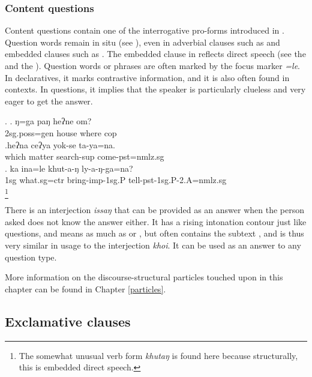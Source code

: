 \subsubsection{Content questions}

Content questions contain one of the interrogative pro-forms introduced in . Question words remain in situ (see \Next[a]), even in adverbial clauses such as \Next[b] and embedded clauses such as \Next[c]. The embedded clause in \Next[c] reflects direct speech (see the  and the ). Question words or phrases are often marked by the focus marker \emph{=le}. In declaratives, it marks contrastive information,  and it is also often found in  contexts. In questions, it implies that the speaker is particularly clueless and very eager to get the answer.
\newpage 

\ex. \ag. ŋ=ga          paŋ  heʔne om?\\
{\sc 2sg.poss=gen} house where {\sc cop}\\
 
\bg.heʔna ceʔya yok-se ta-ya=na.\\
which  matter search{\sc -sup} come{\sc [3sg]-pst=nmlz.sg}\\
\bg. ka ina=le khut-a-ŋ ly-a-ŋ-ga=na?\\
{\sc 1sg} what{\sc .sg=ctr} bring{\sc -imp-1sg.P} tell{\sc -pst-1sg.P-2.A=nmlz.sg}\\
\footnote{The somewhat unusual verb form \emph{khutaŋ}  is found here because structurally, this is embedded direct speech.}


There is an interjection \emph{issaŋ} that can be provided as an answer when the person asked does not know the answer either. It has a rising intonation contour just like questions, and means as much as  or , but often contains the subtext , and is thus very similar in usage to the  interjection \emph{khoi}. It can be used as an answer to any question type.

More information on the discourse-structural particles touched upon in this chapter can be found in Chapter \ref{particles}.

\subsection{Exclamative clauses}

